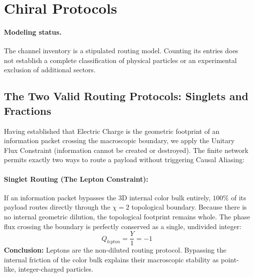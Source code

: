 \section{Chiral Protocols}

\paragraph{Modeling status.} The channel inventory is a stipulated routing model. Counting its entries does not establish a complete classification of physical particles or an experimental exclusion of additional sectors.

\subsection{The Two Valid Routing Protocols: Singlets and Fractions}

Having established that Electric Charge is the geometric footprint of an information packet crossing the macroscopic boundary, we apply the Unitary Flux Constraint (information cannot be created or destroyed). The finite network permits exactly two ways to route a payload without triggering Causal Aliasing:

\paragraph{Singlet Routing (The Lepton Constraint):}
If an information packet bypasses the $3$D internal color bulk entirely, $100\%$ of its payload routes directly through the $\chi=2$ topological boundary. Because there is no internal geometric dilution, the topological footprint remains whole. The phase flux crossing the boundary is perfectly conserved as a single, undivided integer:
\begin{equation}
    Q_{lepton} = \frac{Y}{1} = -1
\end{equation}
\textbf{Conclusion:} Leptons are the non-diluted routing protocol. Bypassing the internal friction of the color bulk explains their macroscopic stability as point-like, integer-charged particles.

